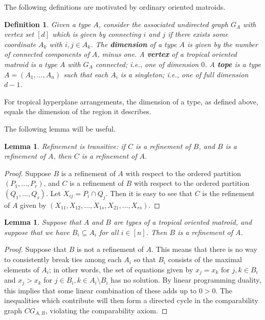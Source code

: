 \documentclass[11pt]{amsart}
\newtheorem{defn}[thm]{Definition}
\newtheorem{lem}[thm]{Lemma}
\begin{document}
The following definitions are motivated by ordinary oriented matroids.


\begin{defn}\label{def:G_A}
Given a type $A$, consider the associated undirected graph $G_A$ with vertex set $[d]$ which is given by connecting $i$ and $j$ if 
there exists some coordinate $A_k$ with $i, j\in A_k$. The \textbf{dimension} of a type $A$ is given by the number of connected components of $A$, minus one. A \textbf{vertex} of a tropical oriented matroid 
is a type $A$ with $G_A$ connected; \emph{i.e.}, one of dimension $0$.  A \textbf{tope} is a type $A = (A_1, \ldots, A_n)$ such that each $A_i$ is a singleton; \emph{i.e.}, one of full dimension $d-1$.
\end{defn}

For tropical hyperplane arrangements, the dimension of a type, as defined above, equals the dimension of the region it describes. \cite[Proposition 17]{DS}

The following lemma will be useful.

\begin{lem}
Refinement is transitive: if $C$ is a refinement of $B$, and $B$ is a refinement of $A$, then $C$ is a refinement 
of $A$.
\end{lem}

\begin{proof}
Suppose $B$ is a refinement of $A$ with respect to the ordered partition $(P_1, \ldots, P_r)$, and $C$ is a 
refinement of $B$ with respect to the ordered partition $(Q_1, \ldots, Q_s)$. Let $X_{ij}=P_i\cap Q_j$. Then it is easy to see that $C$ is the refinement of $A$ given by $(X_{11}, X_{12}, \ldots, X_{1s}, 
X_{21}, \ldots, X_{rs})$.
\end{proof}

\begin{lem}\label{subset-refine}
Suppose that $A$ and $B$ are types of a tropical oriented matroid, and suppose that we have $B_i\subseteq A_i$ for 
all $i\in [n]$. Then $B$ is a refinement of $A$.
\end{lem}

\begin{proof}
Suppose that $B$ is not a refinement of $A$. This means that there is no way to consistently break ties among each 
$A_i$ so that $B_i$ consists of the maximal elements of $A_i$; in other words, the set of equations given by $x_j 
= x_k$ for $j, k\in B_i$ and $x_j > x_k$ for $j\in B_i, k\in A_i\setminus B_i$ has no solution. By linear 
programming duality, this implies that some linear combination of these adds up to $0 > 0$. The inequalities which 
contribute will then form a directed cycle in the comparability graph $CG_{A,B}$, violating the comparability axiom.
\end{proof}
\end{document}
